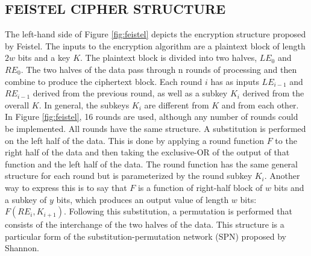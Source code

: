 \documentclass{article}
\begin{document}
\subsection{FEISTEL CIPHER STRUCTURE} 
The left-hand side of Figure \ref{fig:feistel} depicts the encryption structure proposed by Feistel. The inputs to the encryption algorithm are a plaintext
block of length $2w$ bits and a key $K$. The plaintext block is divided into two halves,
$LE_0$ and $RE_0$. The two halves of the data pass through n rounds of processing and
then combine to produce the ciphertext block. Each round $i$ has as inputs $LE_{i-1}$ and
$RE_{i-1}$ derived from the previous round, as well as a subkey $K_i$ derived from the overall
$K$. In general, the subkeys $K_i$ are different from $K$ and from each other. In Figure
\ref{fig:feistel}, 16 rounds are used, although any number of rounds could be implemented.
All rounds have the same structure. A substitution is performed on the left
half of the data. This is done by applying a round function $F$ to the right half of the
data and then taking the exclusive-OR of the output of that function and the left
half of the data. The round function has the same general structure for each round
but is parameterized by the round subkey $K_i$. Another way to express this is to say
that $F$ is a function of right-half block of $w$ bits and a subkey of $y$ bits, which produces
an output value of length $w$ bits: $F(RE_i, K_{i+1})$. Following this substitution, a
permutation is performed that consists of the interchange of the two halves of the
data. This structure is a particular form of the substitution-permutation network
(SPN) proposed by Shannon.
\end{document}
